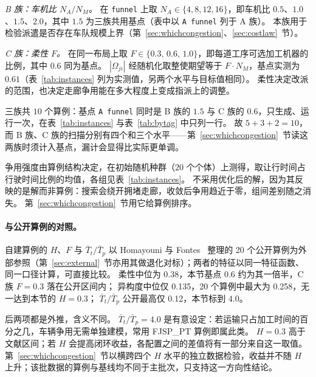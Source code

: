 \documentclass[manuscript,screen,review]{acmart}
\newcommand{\NCases}{10}
\newcommand{\PubFMed}{0.38}              %
\newcommand{\PubHMed}{0.135}             %
\newcommand{\PubHMax}{0.258}             %
\newcommand{\PubTtTpHi}{0.12}            %
\newcommand{\PubNInst}{20}
\begin{document}
\emph{B 族：车机比 $N_A/N_M$。}
在 \texttt{funnel} 上取 $N_A\in\{4,8,12,16\}$，即车机比 $0.5$、$1.0$、$1.5$、$2.0$，其中 $1.5$ 为三族共用基点（表中以 \texttt{A funnel} 列于 A 族）。
本族用于检验派遣是否存在车队规模上界（第~\ref{sec:whichcongestion}、\ref{sec:costlaw}~节）。

\emph{C 族：柔性 $F$。}
在同一布局上取 $F\in\{0.3,\,0.6,\,1.0\}$，即每道工序可选加工机器的比例，其中 $0.6$ 同为基点。
$|\Omega_{ji}|$ 经随机化取整使期望等于 $F\cdot N_M$，基点实测为 $0.61$（表~\ref{tab:instances} 列为实测值，另两个水平与目标值相同）。
柔性决定改派的范围，也决定走廊争用能在多大程度上变成指派上的调整。

三族共 $\NCases$ 个算例：基点 \texttt{A funnel} 同时是 B 族的 $1.5$ 与 C 族的 $0.6$，只生成、运行一次，在表~\ref{tab:instances} 与表~\ref{tab:bytag} 中只列一行。
故 $5+3+2=\NCases$，而 B 族、C 族的扫描分别有四个和三个水平——第~\ref{sec:whichcongestion}~节读这两族时须计入基点，漏计会显得比实际更单调。

争用强度由算例结构决定，在初始随机种群（$20$ 个个体）上测得，取让行时间占行驶时间比例的均值，各组见表~\ref{tab:instances}。
不采用优化后的解，因为其反映的是解而非算例：搜索会绕开拥堵走廊，收敛后争用趋近于零，组间差别随之消失。
第~\ref{sec:whichcongestion}~节用它给算例排序。

\paragraph{与公开算例的对照。}
自建算例的 $H$、$F$ 与 $\bar{T}_t/\bar{T}_p$ 以 Homayouni 与 Fontes~\cite{homayouni2021production} 整理的 \PubNInst{} 个公开算例为外部参照（第~\ref{sec:external}~节亦用其做退化对标）；两者的特征以同一特征函数、同一口径计算，可直接比较。
柔性中位为 \PubFMed{}，本节基点 $0.6$ 约为其一倍半，C 族 $F=0.3$ 落在公开区间内；
异构度中位仅 \PubHMed{}，\PubNInst{} 个算例中最大为 \PubHMax{}，无一达到本节的 $H=0.3$；
$\bar{T}_t/\bar{T}_p$ 公开最高仅 \PubTtTpHi{}，本节标到 $4.0$。

后两项都是外推，含义不同。
$\bar{T}_t/\bar{T}_p=4.0$ 是有意设定：若运输只占加工时间的百分之几，车辆争用无需单独建模，常用 FJSP\_PT 算例即属此类。
$H=0.3$ 高于文献区间；若 $H$ 会提高闭环收益，各配置之间的差值将有一部分来自这一取值。
第~\ref{sec:whichcongestion}~节以横跨四个 $H$ 水平的独立数据检验，收益并不随 $H$ 上升；该批数据的算例与基线均不同于主批次，只支持这一方向性结论。

\begin{table}[t]
\caption{受控算例。全部算例共用 $12$ 工件、$36$ 道真实工序、$8$ 台加工机器、$H=0.3$、
$\bar{T}_t/\bar{T}_p\approx4.0$；三族分别只变化布局、车机比与柔性。争用强度为初始随机种群
上让行时间占行驶总时间的比例，由算例结构决定，不是输入参数。}
\label{tab:instances}
\small

\end{table}
\end{document}
